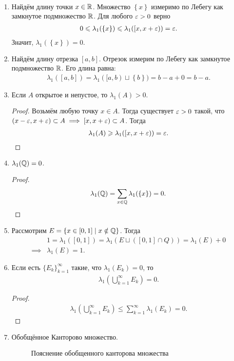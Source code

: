\begin{exmpl}\
 \begin{enumerate}
  \item Найдём длину точки $x \in \mathbb{R}$. Множество $\left\{ x \right\}$ измеримо по Лебегу как замкнутое подмножество $\mathbb{R}$. Для любого $\varepsilon > 0$ верно
   \begin{align*}
    0 \leqslant \lambda_1(\left\{ x \right\}) \leqslant \lambda_1([x, x + \varepsilon)) = \varepsilon
   .\end{align*} Значит, $\lambda_1(\left\{ x \right\}) = 0$.

  \item Найдём длину отрезка $[a,b]$. Отрезок измерим по Лебегу как замкнутое подмножество $\mathbb{R}$. Его длина равна:
   \begin{align*}
    \lambda_1([a,b]) = \lambda_1([a,b) \sqcup \left\{ b \right\}) = b - a + 0 = b - a
   .\end{align*}
  \item Если $A$ открытое и непустое, то $\lambda_1(A) > 0$.
   \begin{proof}
    Возьмём любую точку $x \in A$. Тогда существует $\varepsilon > 0$ такой, что $(x - \varepsilon, x + \varepsilon) \subset A \implies [x, x + \varepsilon) \subset A$. Тогда
    \begin{align*}
     \lambda_1(A) \geqslant \lambda_1([x,x+\varepsilon)) = \varepsilon
    .\end{align*} 
   \end{proof}
  \item $\lambda_1(\mathbb{Q}) = 0$.
   \begin{proof}
    \begin{align*}
     \lambda_1(\mathbb{Q}) = \sum_{x \in \mathbb{Q}} \lambda_1(\left\{ x \right\}) = 0
    .\end{align*}
   \end{proof}
  \item Рассмотрим $E = \left\{ x \in [0,1] \mid x \notin \mathbb{Q} \right\}$. Тогда
   \begin{align*}
    &1 = \lambda_1([0,1]) = \lambda_1(E \sqcup ([0,1] \cap Q)) = \lambda_1(E) + 0 \\
    \implies &\lambda_1(E) = 1.
   \end{align*} 
  \item Если есть $\{E_{k}\}_{k=1}^{\infty} $ такие, что $\lambda_1(E_k) = 0$, то
   \begin{align*}
    \lambda_1 \left( \bigcup_{k=1}^{\infty} E_k \right) = 0
   .\end{align*}
   \begin{proof}
    \begin{align*}
     \lambda_1 \left( \bigcup_{k=1}^{\infty} E_k \right) \leqslant \sum_{k=1}^{\infty} \lambda_1(E_k) = 0
    .\end{align*}
   \end{proof}
  \item Обобщённое Канторово множество.
\begin{figure}[ht]
    \centering
	\caption{Пояснение обобщенного канторова множества}
	\label{fig:пояснение-обобщенного-канторова-множества}
\end{figure}


\end{enumerate}
\end{exmpl}
